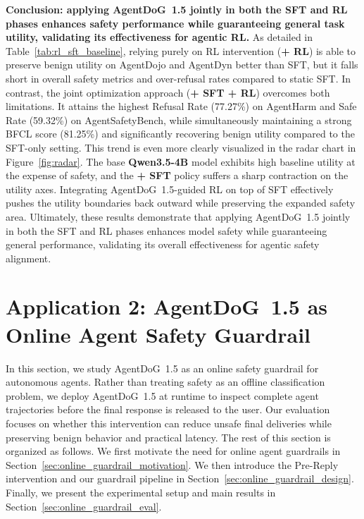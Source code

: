 \documentclass{llmxive}
\providecommand{\toolAG}{{\agentdog{}}\xspace}
\providecommand{\prereply}{{Pre-Reply}\xspace}
\providecommand{\agentdog}{AgentDoG~1.5\xspace}
\begin{document}
\textbf{Conclusion: applying \toolAG{} jointly in both the SFT and RL phases enhances safety performance while guaranteeing general task utility, validating its effectiveness for agentic RL.}  
As detailed in Table~\ref{tab:rl_sft_baseline}, relying purely on RL intervention (\textbf{+ RL}) is able to preserve benign utility on AgentDojo and AgentDyn better than SFT, but it falls short in overall safety metrics and over-refusal rates compared to static SFT. In contrast, the joint optimization approach (\textbf{+ SFT + RL}) overcomes both limitations. It attains the highest Refusal Rate (77.27\%) on AgentHarm and Safe Rate (59.32\%) on AgentSafetyBench, while simultaneously maintaining a strong BFCL score (81.25\%) and significantly recovering benign utility compared to the SFT-only setting. This trend is even more clearly visualized in the radar chart in Figure~\ref{fig:radar}. The base \textbf{Qwen3.5-4B} model exhibits high baseline utility at the expense of safety, and the \textbf{+ SFT} policy suffers a sharp contraction on the utility axes. Integrating \toolAG{}-guided RL on top of SFT effectively pushes the utility boundaries back outward while preserving the expanded safety area. Ultimately, these results demonstrate that applying \toolAG{} jointly in both the SFT and RL phases enhances model safety while guaranteeing general performance, validating its overall effectiveness for agentic safety alignment.

\section{Application 2: \agentdog{} as Online Agent Safety Guardrail}

In this section, we study \agentdog{} as an online safety guardrail for autonomous agents. 
Rather than treating safety as an offline classification problem, we deploy \agentdog{} at runtime to inspect complete agent trajectories before the final response is released to the user. 
Our evaluation focuses on whether this intervention can reduce unsafe final deliveries while preserving benign behavior and practical latency. 
The rest of this section is organized as follows. 
We first motivate the need for online agent guardrails in Section~\ref{sec:online_guardrail_motivation}. 
We then introduce the \prereply{} intervention and our guardrail pipeline in Section~\ref{sec:online_guardrail_design}. 
Finally, we present the experimental setup and main results in Section~\ref{sec:online_guardrail_eval}.
\end{document}
